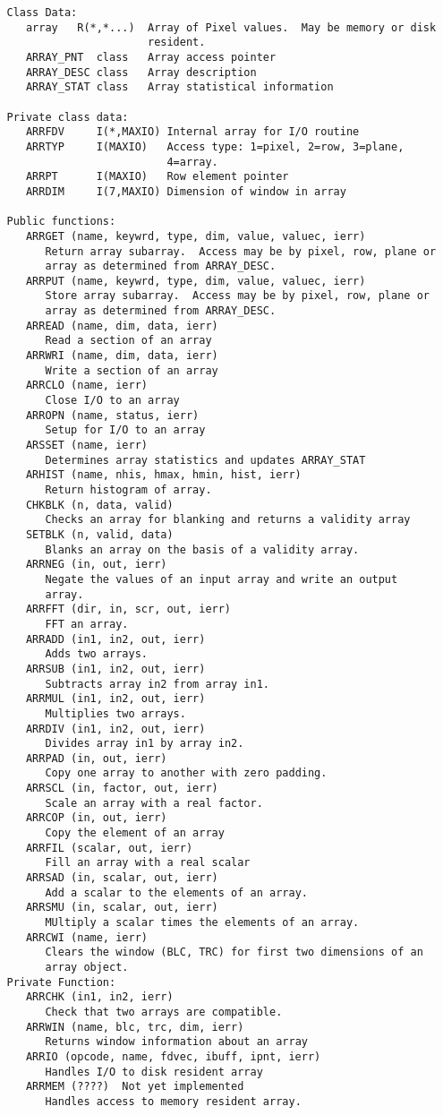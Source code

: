 {\small\begin{verbatim}
   Class Data:
      array   R(*,*...)  Array of Pixel values.  May be memory or disk
                         resident.
      ARRAY_PNT  class   Array access pointer
      ARRAY_DESC class   Array description
      ARRAY_STAT class   Array statistical information

   Private class data:
      ARRFDV     I(*,MAXIO) Internal array for I/O routine
      ARRTYP     I(MAXIO)   Access type: 1=pixel, 2=row, 3=plane,
                            4=array.
      ARRPT      I(MAXIO)   Row element pointer
      ARRDIM     I(7,MAXIO) Dimension of window in array

   Public functions:
      ARRGET (name, keywrd, type, dim, value, valuec, ierr)
         Return array subarray.  Access may be by pixel, row, plane or
         array as determined from ARRAY_DESC.
      ARRPUT (name, keywrd, type, dim, value, valuec, ierr)
         Store array subarray.  Access may be by pixel, row, plane or
         array as determined from ARRAY_DESC.
      ARREAD (name, dim, data, ierr)
         Read a section of an array
      ARRWRI (name, dim, data, ierr)
         Write a section of an array
      ARRCLO (name, ierr)
         Close I/O to an array
      ARROPN (name, status, ierr)
         Setup for I/O to an array
      ARSSET (name, ierr)
         Determines array statistics and updates ARRAY_STAT
      ARHIST (name, nhis, hmax, hmin, hist, ierr)
         Return histogram of array.
      CHKBLK (n, data, valid)
         Checks an array for blanking and returns a validity array
      SETBLK (n, valid, data)
         Blanks an array on the basis of a validity array.
      ARRNEG (in, out, ierr)
         Negate the values of an input array and write an output
         array.
      ARRFFT (dir, in, scr, out, ierr)
         FFT an array.
      ARRADD (in1, in2, out, ierr)
         Adds two arrays.
      ARRSUB (in1, in2, out, ierr)
         Subtracts array in2 from array in1.
      ARRMUL (in1, in2, out, ierr)
         Multiplies two arrays.
      ARRDIV (in1, in2, out, ierr)
         Divides array in1 by array in2.
      ARRPAD (in, out, ierr)
         Copy one array to another with zero padding.
      ARRSCL (in, factor, out, ierr)
         Scale an array with a real factor.
      ARRCOP (in, out, ierr)
         Copy the element of an array
      ARRFIL (scalar, out, ierr)
         Fill an array with a real scalar
      ARRSAD (in, scalar, out, ierr)
         Add a scalar to the elements of an array.
      ARRSMU (in, scalar, out, ierr)
         MUltiply a scalar times the elements of an array.
      ARRCWI (name, ierr)
         Clears the window (BLC, TRC) for first two dimensions of an
         array object.
   Private Function:
      ARRCHK (in1, in2, ierr)
         Check that two arrays are compatible.
      ARRWIN (name, blc, trc, dim, ierr)
         Returns window information about an array
      ARRIO (opcode, name, fdvec, ibuff, ipnt, ierr)
         Handles I/O to disk resident array
      ARRMEM (????)  Not yet implemented
         Handles access to memory resident array.
\end{verbatim}}
